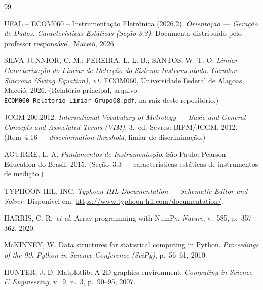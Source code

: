\begin{thebibliography}{99}

UFAL -- ECOM060 -- Instrumentação Eletrônica (2026.2).
\emph{Orientação --- Geração de Dados: Características Estáticas (Seção 3.3)}.
Documento distribuído pelo professor responsável, Maceió, 2026.

SILVA JUNNIOR, C. M.; PEREIRA, L. L. B.; SANTOS, W. T. O.
\emph{Limiar --- Caracterização do Limiar de Detecção do Sistema Instrumentado: Gerador
Síncrono (Swing Equation), v1}. ECOM060, Universidade Federal de Alagoas, Maceió, 2026.
(Relatório principal, arquivo \texttt{ECOM060\_Relatorio\_Limiar\_Grupo08.pdf}, na raiz deste
repositório.)

JCGM 200:2012.
\emph{International Vocabulary of Metrology --- Basic and General Concepts and Associated Terms
(VIM)}. 3.~ed. Sèvres: BIPM/JCGM, 2012.
(Item~4.16 --- \emph{discrimination threshold}, limiar de discriminação.)

AGUIRRE, L. A.
\emph{Fundamentos de Instrumentação}. São Paulo: Pearson Education do Brasil, 2015.
(Seção~3.3 --- características estáticas de instrumentos de medição.)

TYPHOON HIL, INC.
\emph{Typhoon HIL Documentation --- Schematic Editor and Solver}.
Disponível em: \url{https://www.typhoon-hil.com/documentation/}.

HARRIS, C. R.\ \emph{et al.}
Array programming with NumPy. \emph{Nature}, v.~585, p.~357--362, 2020.

McKINNEY, W.
Data structures for statistical computing in Python.
\emph{Proceedings of the 9th Python in Science Conference (SciPy)}, p.~56--61, 2010.

HUNTER, J. D.
Matplotlib: A 2D graphics environment.
\emph{Computing in Science \& Engineering}, v.~9, n.~3, p.~90--95, 2007.

\end{thebibliography}
